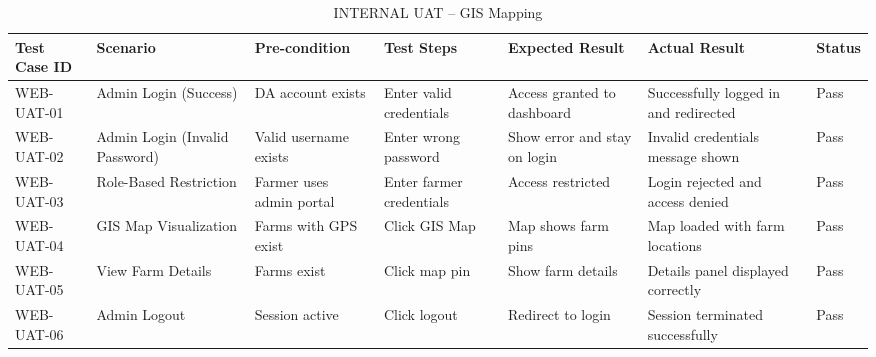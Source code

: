 {	\begin{table}[H]
		\centering
		\caption{INTERNAL UAT – GIS Mapping}
		\renewcommand{\arraystretch}{1.2}
		\begin{adjustbox}{max width=\textwidth}
			\begin{tabular}{p{2cm}p{3cm}p{3cm}p{3cm}p{4cm}p{4cm}p{1.5cm}}
				\toprule
				\textbf{Test Case ID} & \textbf{Scenario} & \textbf{Pre-condition} & \textbf{Test Steps} & \textbf{Expected Result} & \textbf{Actual Result} & \textbf{Status} \\
				\midrule
				WEB-UAT-01 & Admin Login (Success) & DA account exists & Enter valid credentials & Access granted to dashboard & Successfully logged in and redirected & Pass \\
				WEB-UAT-02 & Admin Login (Invalid Password) & Valid username exists & Enter wrong password & Show error and stay on login & Invalid credentials message shown & Pass \\
				WEB-UAT-03 & Role-Based Restriction & Farmer uses admin portal & Enter farmer credentials & Access restricted & Login rejected and access denied & Pass \\
				WEB-UAT-04 & GIS Map Visualization & Farms with GPS exist & Click GIS Map & Map shows farm pins & Map loaded with farm locations & Pass \\
				WEB-UAT-05 & View Farm Details & Farms exist & Click map pin & Show farm details & Details panel displayed correctly & Pass \\
				WEB-UAT-06 & Admin Logout & Session active & Click logout & Redirect to login & Session terminated successfully & Pass \\
				\bottomrule
			\end{tabular}
		\end{adjustbox}
	\end{table}
	
}
